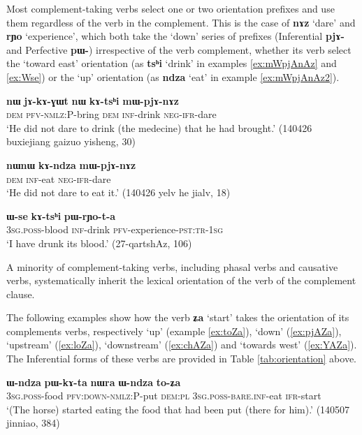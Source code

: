 \documentclass[oneside,a4paper,11pt]{article}
\newcommand{\ipa}[1]{\textbf{\phon#1}} %
\newcommand{\jpg}[2]{\ipa{#1} `#2'} %
\newcommand{\refb}[1]{(\ref{#1})}
\begin{document}
Most complement-taking verbs select one or two orientation prefixes and use them regardless of the verb in the complement. This is the case of \jpg{nɤz}{dare} and  \jpg{rɲo}{experience}, which both take the `down' series of prefixes (Inferential \ipa{pjɤ-} and Perfective \ipa{pɯ-}) irrespective of the verb complement, whether its verb select the `toward east' orientation (as \jpg{tsʰi}{drink} in examples \ref{ex:mWpjAnAz} and \ref{ex:Wse}) or the `up' orientation (as \jpg{ndza}{eat} in example \ref{ex:mWpjAnAz2}).

\begin{exe}
\ex \label{ex:mWpjAnAz}
\gll \ipa{nɯ} 	\ipa{jɤ-kɤ-ɣɯt} 	\ipa{nɯ} 	\ipa{kɤ-tsʰi} 	\ipa{mɯ-pjɤ-nɤz} \\
\textsc{dem} \textsc{pfv-nmlz}:P-bring \textsc{dem} \textsc{inf}-drink \textsc{neg-ifr}-dare \\
\glt `He did not dare to drink (the medecine) that he had brought.' (140426 buxiejiang gaizuo yisheng, 30)
\end{exe}
\begin{exe}
\ex \label{ex:mWpjAnAz2}
\gll
\ipa{nɯnɯ} 	\ipa{kɤ-ndza} 	\ipa{mɯ-pjɤ-nɤz} \\
\textsc{dem} \textsc{inf}-eat \textsc{neg-ifr}-dare \\
\glt `He did not dare to eat it.' (140426 yelv he jialv, 18)
\end{exe}

\begin{exe}
\ex \label{ex:Wse}
\gll
\ipa{ɯ-se} 	\ipa{kɤ-tsʰi} 	\ipa{pɯ-rɲo-t-a} \\
\textsc{3sg.poss}-blood \textsc{inf}-drink \textsc{pfv}-experience-\textsc{pst:tr-1sg} \\
\glt `I have drunk its blood.' (27-qartshAz, 106)
\end{exe}

A minority of complement-taking verbs, including phasal verbs and causative verbs, systematically inherit the lexical orientation of the verb of the complement clause. 

The following examples show how the verb \jpg{ʑa}{start} takes the orientation of its complements verbs, respectively `up' (example \ref{ex:toZa}), `down' \refb{ex:pjAZa}, `upstream' \refb{ex:loZa}, `downstream' \refb{ex:chAZa} and `towards west' \refb{ex:YAZa}. The Inferential forms of these verbs are provided in Table \ref{tab:orientation} above.

\begin{exe}
\ex \label{ex:toZa}
\gll \ipa{ɯ-ndza} 	\ipa{pɯ-kɤ-ta} 	\ipa{nɯra} 	\ipa{ɯ-ndza} 	\ipa{to-ʑa} \\
\textsc{3sg.poss}-food \textsc{pfv:down-nmlz:P}-put \textsc{dem:pl} \textsc{3sg.poss-bare.inf}-eat \textsc{ifr}-start \\
\glt `(The horse) started eating the food that had been put (there for him).' (140507 jinniao, 384)
\end{exe}
\end{document}

